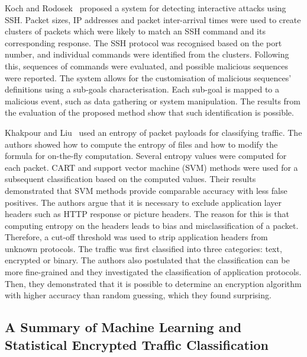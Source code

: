Koch and Rodosek~\cite{Koch-2010-Command} proposed a system for detecting interactive attacks using SSH. Packet sizes, IP addresses and packet inter-arrival times were used to create clusters of packets which were likely to match an SSH command and its corresponding response. The SSH protocol was recognised based on the port number, and individual commands were identified from the clusters. Following this, sequences of commands were evaluated, and possible malicious sequences were reported. The system allows for the customisation of malicious sequences' definitions using a sub-goals characterisation. Each sub-goal is mapped to a malicious event, such as data gathering or system manipulation. The results from the evaluation of the proposed method show that such identification is possible. 

Khakpour and Liu~\cite{Khakpour-2013-Information} used an entropy of packet payloads for classifying traffic. The authors showed how to compute the entropy of files and how to modify the formula for on-the-fly computation. Several entropy values were computed for each packet. CART and support vector machine (SVM) methods were used for a subsequent classification based on the computed values. Their results demonstrated that SVM methods provide comparable accuracy with less false positives. The authors argue that it is necessary to exclude application layer headers such as HTTP response or picture headers. The reason for this is that computing entropy on the headers leads to bias and misclassification of a packet. Therefore, a cut-off threshold was used to strip application headers from unknown protocols. The traffic was first classified into three categories: text, encrypted or binary. The authors also postulated that the classification can be more fine-grained and they investigated the classification of application protocols. Then, they demonstrated that it is possible to determine an encryption algorithm with higher accuracy than random guessing, which they found surprising.

\subsection{A Summary of Machine Learning and Statistical Encrypted Traffic Classification}\label{subsec:methods-summary}

